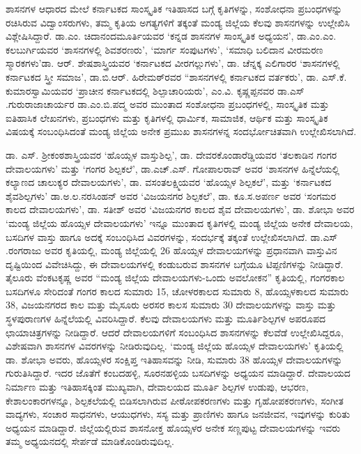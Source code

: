ಶಾಸನಗಳ ಆಧಾರದ ಮೇಲೆ ಕರ್ನಾಟಕದ ಸಾಂಸ್ಕೃತಿಕ ಇತಿಹಾಸದ ಬಗ್ಗೆ ಕೃತಿಗಳನ್ನು, ಸಂಶೋಧನಾ ಪ್ರಬಂಧಗಳನ್ನು ರಚಿಸಿರುವ ವಿದ್ವಾಂಸರುಗಳು, ತಮ್ಮ ಕೃತಿಯ ಅಗತ್ಯಗಳಿಗೆ ತಕ್ಕಂತೆ ಮಂಡ್ಯ ಜಿಲ್ಲೆಯ ಕೆಲವು ಶಾಸನಗಳನ್ನು ಉಲ್ಲೇಖಿಸಿ ವಿಶ್ಲೇಷಿಸಿದ್ದಾರೆ. ಡಾ.ಎಂ. ಚಿದಾನಂದಮೂರ್ತಿಯವರ ‘ಕನ್ನಡ ಶಾಸನಗಳ ಸಾಂಸ್ಕೃತಿಕ ಅಧ್ಯಯನ’, ಡಾ.ಎಂ.ಎಂ. ಕಲಬುರ್ಗಿಯವರ ‘ಶಾಸನಗಳಲ್ಲಿ ಶಿವಶರಣರು’, ‘ಮಾರ್ಗ ಸಂಪುಟಗಳು’, ‘ಸಮಾಧಿ ಬಲಿದಾನ ವೀರಮರಣ ಸ್ಮಾರಕಗಳು’\break ಡಾ. ಆರ್​. ಶೇಷಶಾಸ್ತ್ರಿಯವರ ‘ಕರ್ನಾಟಕದ ವೀರಗಲ್ಲುಗಳು’, ಡಾ. ಚೆನ್ನಕ್ಕ ಎಲಿಗಾರರ ‘ಶಾಸನಗಳಲ್ಲಿ ಕರ್ನಾಟಕದ ಸ್ತ್ರೀ ಸಮಾಜ’, ಡಾ.ಬಿ.ಆರ್​. ಹಿರೇಮಠ್​ರವರ “ಶಾಸನಗಳಲ್ಲಿ ಕರ್ನಾಟಕದ ವರ್ತಕರು’, ಡಾ. ಎಸ್​.ಕೆ. ಕುಮಾರಸ್ವಾಮಿಯವರ ‘ಪ್ರಾಚೀನ ಕರ್ನಾಟಕದಲ್ಲಿ ಶಿಲ್ಪಾಚಾರಿಯರು’, ಎಂ.ವಿ. ಕೃಷ್ಣಪ್ಪನವರ  ಡಾ.ಎಸ್​.ಗುರುರಾಜಾಚಾರ್ಯರ  ಡಾ.ಎಂ.ಬಿ.ಪದ್ಮ ಅವರ  ಮುಂತಾದ ಸಂಶೋಧನಾ ಪ್ರಬಂಧಗಳಲ್ಲಿ, ಸಾಂಸ್ಕೃತಿಕ ಮತ್ತು ಐತಿಹಾಸಿಕ ಲೇಖನಗಳು, ಪ್ರಬಂಧಗಳು ಮತ್ತು ಕೃತಿಗಳಲ್ಲಿ ಧಾರ್ಮಿಕ, ಸಾಮಾಜಿಕ, ಆರ್ಥಿಕ ಮತ್ತು ಸಾಂಸ್ಕೃತಿಕ ವಿಷಯಕ್ಕೆ ಸಂಬಂಧಿಸಿದಂತೆ ಮಂಡ್ಯ ಜಿಲ್ಲೆಯ ಅನೇಕ ಪ್ರಮುಖ ಶಾಸನಗಳನ್ನ ಸಂದರ್ಭೋಚಿತವಾಗಿ ಉಲ್ಲೇಖಿಸಲಾಗಿದೆ.

ಡಾ. ಎಸ್​. ಶ‍್ರೀಕಂಠಶಾಸ್ತ್ರಿಯವರ ‘ಹೊಯ್ಸಳ ವಾಸ್ತುಶಿಲ್ಪ’, ಡಾ. ದೇವರಕೊಂಡಾರೆಡ್ಡಿಯವರ ‘ತಲಕಾಡಿನ ಗಂಗರ ದೇವಾಲಯಗಳು’ ಮತ್ತು ‘ಗಂಗರ ಶಿಲ್ಪಕಲೆ’, ಡಾ.ಎಚ್​.ಎಸ್​. ಗೋಪಾಲರಾವ್​ ಅವರ ‘ಶಾಸನಗಳ ಹಿನ್ನೆಲೆಯಲ್ಲಿ ಕಲ್ಯಾಣದ ಚಾಲುಕ್ಯರ ದೇವಾಲಯಗಳು’, ಡಾ. ವಸಂತಲಕ್ಷ್ಮಿಯವರ ‘ಹೊಯ್ಸಳ ಶಿಲ್ಪಕಲೆ’, ಮತ್ತು ‘ಕರ್ನಾಟಕದ ಶೈವಶಿಲ್ಪಗಳು’ ಡಾ.ಅ.ಲ.ನರಸಿಂಹನ್​ ಅವರ ‘ವಿಜಯನಗರ ಶಿಲ್ಪಕಲೆ’, ಡಾ. ಕೂ.ಸ.ಅಪರ್ಣ ಅವರ ‘ಸಂಗಮರ ಕಾಲದ ದೇವಾಲಯಗಳು’, ಡಾ. ಸತೀಶ್​ ಅವರ ‘ವಿಜಯನಗರ ಕಾಲದ ಶೈವ ದೇವಾಲಯಗಳು’, ಡಾ. ಶೋಭಾ ಅವರ ‘ಮಂಡ್ಯ ಜಿಲ್ಲೆಯ ಹೊಯ್ಸಳ ದೇವಾಲಯಗಳು’ ಇನ್ನೂ ಮುಂತಾದ ಕೃತಿಗಳಲ್ಲಿ ಮಂಡ್ಯ ಜಿಲ್ಲೆಯ ಅನೇಕ ದೇವಾಲಯ, ಬಸದಿಗಳ ವಾಸ್ತು ಹಾಗೂ ಅದಕ್ಕೆ ಸಂಬಂಧಿಸಿದ ವಿವರಗಳನ್ನು, ಸಂದರ್ಭಕ್ಕೆ ತಕ್ಕಂತೆ ಉಲ್ಲೇಖಿಸಲಾಗಿದೆ. ಡಾ.ಎಸ್​.ರಂಗರಾಜು ಅವರ  ಕೃತಿಯಲ್ಲಿ, ಮಂಡ್ಯ ಜಿಲ್ಲೆಯಲ್ಲಿ 26 ಹೊಯ್ಸಳ ದೇವಾಲಯಗಳನ್ನು ಪ್ರಧಾನವಾಗಿ ವಾಸ್ತುವಿನ ದೃಷ್ಟಿಯಿಂದ ವಿವೇಚಿಸಿದ್ದು, ಈ ದೇವಾಲಯಗಳಲ್ಲಿ ಕಂಡುಬರುವ ಶಾಸನಗಳ ಬಗ್ಗೆಯೂ ಟಿಪ್ಪಣಿಗಳನ್ನು ನೀಡಿದ್ದಾರೆ. ತೈಲೂರು ವೆಂಕಟಕೃಷ್ಣ ಅವರ “ಮಂಡ್ಯ ಜಿಲ್ಲೆಯ ದೇವಾಲಯಗಳು-ಒಂದು ಅವಲೋಕನ” ಕೃತಿಯಲ್ಲಿ, ಗಂಗರಕಾಲ ಬಸದಿಗಳೂ ಸೇರಿದಂತೆ ಗಂಗರ ಕಾಲದ ಸುಮಾರು 15, ಚೋಳರಕಾಲದ ಸುಮಾರು 8, ಹೊಯ್ಸಳಕಾಲದ ಸುಮಾರು 38, ವಿಜಯನಗರದ ಕಾಲ ಮತ್ತು ಮೈಸೂರು ಅರಸರ ಕಾಲಸ ಸುಮಾರು 30 ದೇವಾಲಯಗಳನ್ನು ವಾಸ್ತು ಮತ್ತು ಸ್ಥಳಪುರಾಣಗಳ ಹಿನ್ನೆಲೆಯಲ್ಲಿ ವಿವರಿಸಿದ್ದಾರೆ. ಕೆಲವು ದೇವಾಲಯಗಳು ಮತ್ತು ಮೂರ್ತಿಶಿಲ್ಪಗಳ ಅಪರೂಪದ ಛಾಯಾಚಿತ್ರಗಳನ್ನು ನೀಡಿದ್ದಾರೆ. ಆದರೆ ದೇವಾಲಯಗಳಿಗೆ ಸಂಬಂಧಿಸಿದ ಶಾಸನಗಳನ್ನು ಕೆಲವೆಡೆ ಉಲ್ಲೇಖಿಸಿದ್ದರೂ, ವಿಶೇಷವಾಗಿ ಶಾಸನಗಳ ವಿವರಗಳನ್ನು ನೀಡಿರುವುದಿಲ್ಲ. ‘ಮಂಡ್ಯ ಜಿಲ್ಲೆಯ ಹೊಯ್ಸಳ ದೇವಾಲಯಗಳು’ ಕೃತಿಯಲ್ಲಿ ಡಾ. ಶೋಭಾ ಅವರು, ಹೊಯ್ಸಳರ ಸಂಕ್ಷಿಪ್ತ ಇತಿಹಾಸವನ್ನು ನೀಡಿ, ಸುಮಾರು 38 ಹೊಯ್ಸಳ ದೇವಾಲಯಗಳನ್ನು ಗುರುತಿಸಿದ್ದಾರೆ. ಇದರ ಜೊತೆಗೆ ಕಂಬದಹಳ್ಳಿ, ಸೂರನಹಳ್ಳಿಯ ಬಸದಿಗಳನ್ನು ಅಧ್ಯಯನ ಮಾಡಿದ್ದಾರೆ. ದೇವಾಲಯದ ನಿರ್ಮಾಣ ಮತ್ತು ಇತಿಹಾಸಕ್ಕಿಂತ ಮುಖ್ಯವಾಗಿ, ದೇವಾಲಯದ ಮೂರ್ತಿ ಶಿಲ್ಪಗಳ ಉಡುಪು, ಆಭರಣ, ಕೇಶಾಲಂಕಾರಗಳನ್ನೂ, ಶಿಲ್ಪಕಲೆಯಲ್ಲಿ ಬಿಡಿಸಲಾಗಿರುವ ಪೀಠೋಪಕರಣಗಳು ಮತ್ತು ಗೃಹೋಪಕರಣಗಳು, ಸಂಗೀತ ವಾದ್ಯಗಳು, ಸಂಚಾರ ಸಾಧನಗಳು, ಆಯುಧಗಳು, ಸಸ್ಯ ಮತ್ತು ಪ್ರಾಣಿಗಳು ಹಾಗೂ ಜನಜೀವನ, ಇವುಗಳನ್ನು ಕುರಿತು ಅಧ್ಯಯನ ಮಾಡಿದ್ದಾರೆ. ಜಿಲ್ಲೆಯಲ್ಲಿರುವ ಶಾಸನೋಕ್ತ ಹೊಯ್ಸಳರ ಅನೇಕ ಸಣ್ಣಪುಟ್ಟ ದೇವಾಲಯಗಳನ್ನು ಇವರು ತಮ್ಮ ಅಧ್ಯಯನದಲ್ಲಿ ಸೇರ್ಪಡೆ ಮಾಡಿಕೊಂಡಿರುವುದಿಲ್ಲ.

